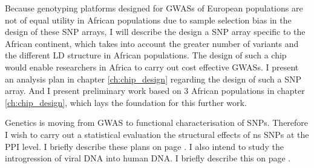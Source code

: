 Because genotyping platforms designed for \glspl{GWAS} of European populations are not of equal utility in African populations due to sample selection bias in the design of these \gls{SNP} arrays, I will describe the design a \gls{SNP} array specific to the African continent, which takes into account the greater number of variants and the different \gls{LD} structure in African populations. The design of such a chip would enable researchers in Africa to carry out cost effective \glspl{GWAS}. I present an analysis plan in chapter \ref{ch:chip_design} regarding the design of such a \gls{SNP} array. And I present preliminary work based on 3 African populations in chapter \ref{ch:chip_design}, which lays the foundation for this further work.

Genetics is moving from \gls{GWAS} to functional characterisation of \glspl{SNP}. Therefore I wish to carry out a statistical evaluation the structural effects of \gls{ns} \glspl{SNP} at the \gls{PPI} level. I briefly describe these plans on page \pageref{ch:future}. I also intend to study the introgression of viral DNA into human DNA. I briefly describe this on page \pageref{ch:future}.





